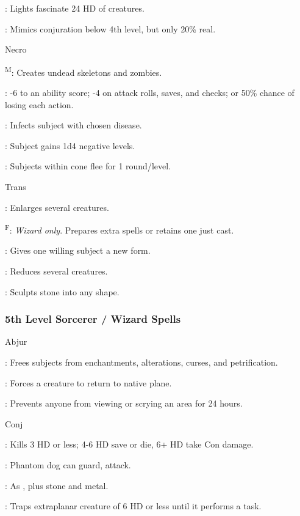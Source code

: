 : Lights fascinate 24 HD of creatures.

: Mimics conjuration below 4th level, but only 20\% real.

Necro

\textsuperscript{M}: Creates undead skeletons and zombies.

: -6 to an ability score; -4 on attack rolls, saves, and checks; or 50\% chance of losing each action.

: Infects subject with chosen disease.

: Subject gains 1d4 negative levels.

: Subjects within cone flee for 1 round/level.

Trans

: Enlarges several creatures.

\textsuperscript{F}: \textit{Wizard only}. Prepares extra spells or retains one just cast.

: Gives one willing subject a new form.

: Reduces several creatures.

: Sculpts stone into any shape.

\subsubsection{5th Level Sorcerer / Wizard Spells}

Abjur

: Frees subjects from enchantments, alterations, curses, and petrification.

: Forces a creature to return to native plane.

: Prevents anyone from viewing or scrying an area for 24 hours.

Conj

: Kills 3 HD or less; 4-6 HD save or die, 6+ HD take Con damage.

: Phantom dog can guard, attack.

: As , plus stone and metal.

: Traps extraplanar creature of 6 HD or less until it performs a task.

